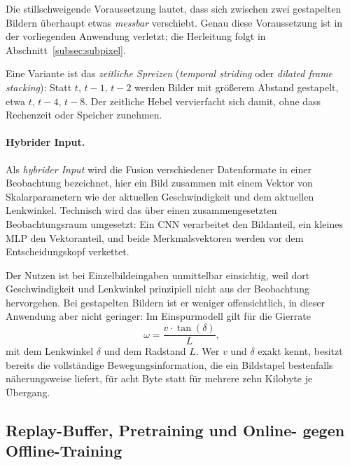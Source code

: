 Die stillschweigende Voraussetzung lautet, dass sich zwischen zwei gestapelten Bildern überhaupt etwas \emph{messbar} verschiebt. Genau diese Voraussetzung ist in der vorliegenden Anwendung verletzt; die Herleitung folgt in Abschnitt~\ref{subsec:subpixel}.

Eine Variante ist das \emph{zeitliche Spreizen} (\emph{temporal striding} oder \emph{dilated frame stacking}): Statt $t,\,t-1,\,t-2$ werden Bilder mit größerem Abstand gestapelt, etwa $t,\,t-4,\,t-8$. Der zeitliche Hebel vervierfacht sich damit, ohne dass Rechenzeit oder Speicher zunehmen.

\paragraph{Hybrider Input.}
Als \emph{hybrider Input} wird die Fusion verschiedener Datenformate in einer Beobachtung bezeichnet, hier ein Bild zusammen mit einem Vektor von Skalarparametern wie der aktuellen Geschwindigkeit und dem aktuellen Lenkwinkel. Technisch wird das über einen zusammengesetzten Beobachtungsraum umgesetzt: Ein \ac{CNN} verarbeitet den Bildanteil, ein kleines \ac{MLP} den Vektoranteil, und beide Merkmalsvektoren werden vor dem Entscheidungskopf verkettet.

Der Nutzen ist bei Einzelbildeingaben unmittelbar einsichtig, weil dort Geschwindigkeit und Lenkwinkel prinzipiell nicht aus der Beobachtung hervorgehen. Bei gestapelten Bildern ist er weniger offensichtlich, in dieser Anwendung aber nicht geringer: Im Einspurmodell gilt für die Gierrate
\begin{equation}
  \omega = \frac{v \cdot \tan\!\left( \delta \right)}{L},
  \label{eq:einspur_omega}
\end{equation}
mit dem Lenkwinkel $\delta$ und dem Radstand $L$. Wer $v$ und $\delta$ exakt kennt, besitzt bereits die vollständige Bewegungsinformation, die ein Bildstapel bestenfalls näherungsweise liefert, für acht Byte statt für mehrere zehn Kilobyte je Übergang.

\subsection{Replay-Buffer, Pretraining und Online- gegen Offline-Training}
\label{subsec:replay}

